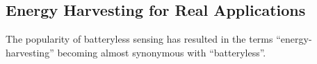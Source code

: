 %
%

\subsection{Energy Harvesting for Real Applications}
The popularity of batteryless sensing has resulted in the terms ``energy-harvesting'' becoming almost synonymous with ``batteryless''.

